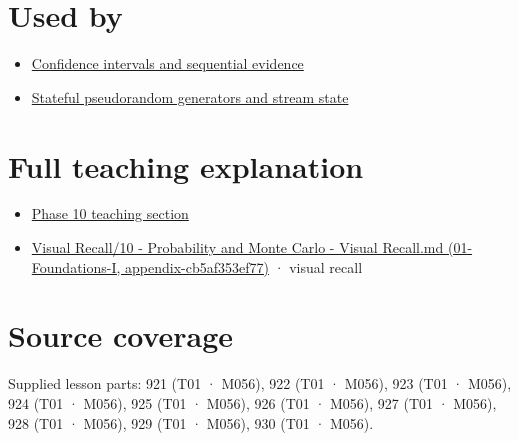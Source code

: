 \section{Used by}\label{appendix-a2360b435383-used-by}

\begin{itemize}
\tightlist
\item
  \hyperref[appendix-c83016554b1e]{Confidence intervals and sequential evidence}
\item
  \hyperref[appendix-e0f7c7e08f3a]{Stateful pseudorandom generators and stream state}
\end{itemize}

\section{Full teaching explanation}\label{appendix-a2360b435383-full-teaching-explanation}

\begin{itemize}
\tightlist
\item
  \href{Continuous\%20Notes/Computing\%20Foundations\%20-\%20From\%20Bits\%20to\%20C++\%20and\%20Systems\%20APIs\#4.\%20Discrete\%20and\%20continuous\%20distribution\%20families}{Phase 10 teaching section}
\item
  \href{../01-Foundations-I/main.pdf\#nameddest=appendix-cb5af353ef77}{Visual Recall/10 - Probability and Monte Carlo - Visual Recall.md (01-Foundations-I, appendix-cb5af353ef77)} · visual recall
\end{itemize}

\section{Source coverage}\label{appendix-a2360b435383-source-coverage}

Supplied lesson parts: 921 (T01 · M056), 922 (T01 · M056), 923 (T01 · M056), 924 (T01 · M056), 925 (T01 · M056), 926 (T01 · M056), 927 (T01 · M056), 928 (T01 · M056), 929 (T01 · M056), 930 (T01 · M056).
